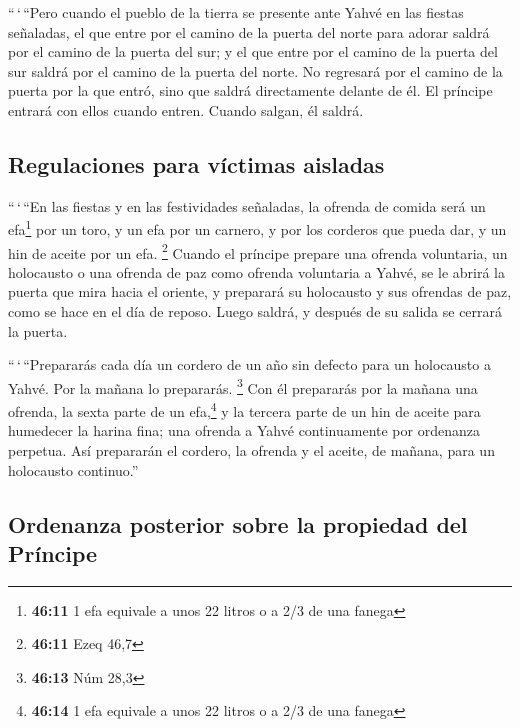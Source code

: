 \begin{paracol}{2}
 ``\,`\,``Pero cuando el pueblo de la tierra se presente
ante Yahvé en las fiestas señaladas, el que entre por el camino de la
puerta del norte para adorar saldrá por el camino de la puerta del sur;
y el que entre por el camino de la puerta del sur saldrá por el camino
de la puerta del norte. No regresará por el camino de la puerta por la
que entró, sino que saldrá directamente delante de él. 
El príncipe entrará con ellos cuando entren. Cuando salgan, él saldrá.

\hypertarget{regulaciones-para-vuxedctimas-aisladas}{%
\subsection{Regulaciones para víctimas
aisladas}\label{regulaciones-para-vuxedctimas-aisladas}}

 ``\,`\,``En las fiestas y en las festividades señaladas,
la ofrenda de comida será un efa\footnote{\textbf{46:11} 1 efa equivale
  a unos 22 litros o a 2/3 de una fanega} por un toro, y un efa por un
carnero, y por los corderos que pueda dar, y un hin de aceite por un
efa. \footnote{\textbf{46:11} Ezeq 46,7}  Cuando el
príncipe prepare una ofrenda voluntaria, un holocausto o una ofrenda de
paz como ofrenda voluntaria a Yahvé, se le abrirá la puerta que mira
hacia el oriente, y preparará su holocausto y sus ofrendas de paz, como
se hace en el día de reposo. Luego saldrá, y después de su salida se
cerrará la puerta.

 ``\,`\,``Prepararás cada día un cordero de un año sin
defecto para un holocausto a Yahvé. Por la mañana lo prepararás.
\footnote{\textbf{46:13} Núm 28,3}  Con él prepararás por
la mañana una ofrenda, la sexta parte de un efa,\footnote{\textbf{46:14}
  1 efa equivale a unos 22 litros o a 2/3 de una fanega} y la tercera
parte de un hin de aceite para humedecer la harina fina; una ofrenda a
Yahvé continuamente por ordenanza perpetua.  Así
prepararán el cordero, la ofrenda y el aceite, de mañana, para un
holocausto continuo.''

\hypertarget{ordenanza-posterior-sobre-la-propiedad-del-pruxedncipe}{%
\subsection{Ordenanza posterior sobre la propiedad del
Príncipe}\label{ordenanza-posterior-sobre-la-propiedad-del-pruxedncipe}}


\end{paracol}
